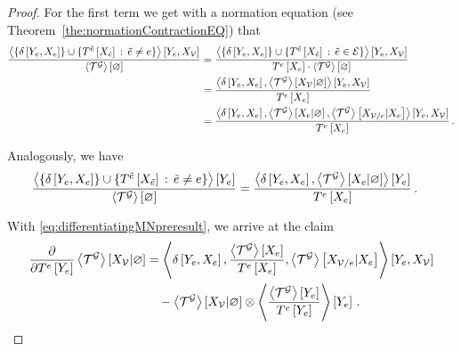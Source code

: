 \begin{proof}
    For the first term we get with a normation equation (see Theorem~\ref{the:normationContractionEQ}) that
    \begin{align*}
        \frac{ \left\langle \{\delta\left[Y_{e},X_{e}\right]\}\cup\{T^{\tilde{e}}\left[X_{\tilde{e}}\right] \, : \, \tilde{e}\neq e \}\right\rangle \left[ Y_{e},X_{\mathcal{V}} \right]}{\left\langle \mathcal{T}^{\mathcal{G}}\right\rangle \left[ \varnothing \right]}
        &= \frac{\left\langle \{\delta\left[Y_{e},X_{e}\right]\}\cup\{T^{\tilde{e}}\left[X_{\tilde{e}}\right] \, : \, \tilde{e}\in\mathcal{E} \}\right\rangle \left[ Y_{e},X_{\mathcal{V}} \right]}{T^{e}\left[X_{e}\right]  \cdot \left\langle \mathcal{T}^{\mathcal{G}}\right\rangle \left[ \varnothing \right]} \\
        &= \frac{
            \left\langle \delta\left[Y_{e},X_{e}\right],\left\langle \mathcal{T}^{\mathcal{G}}\right\rangle \left[ X_{\mathcal{V}} | \varnothing \right]\right\rangle \left[ Y_{e},X_{\mathcal{V}} \right]
        }{T^{e}\left[X_{e}\right]}  \\
        &= \frac{\left\langle \delta\left[Y_{e},X_{e}\right],
            \left\langle \mathcal{T}^{\mathcal{G}}\right\rangle \left[ X_{e} | \varnothing \right],
            \left\langle \mathcal{T}^{\mathcal{G}}\right\rangle \left[ X_{\mathcal{V}/e} | X_{e} \right]
        \right\rangle \left[ Y_{e},X_{\mathcal{V}} \right]
        }{T^{e}\left[X_{e}\right]}  \, .
    \end{align*}

    Analogously, we have
    \begin{align*}
        \frac{ \contractionof{\{\identityat{\seccatvariableof{\edge},\edgevariables}\}\cup\{\hypercoreofat{\secedge}{\catvariableof{\secedge}} \, : \, \secedge\neq\edge \}}{\seccatvariableof{\edge}}}{\contraction{\extnet}}
        &= \frac{\sbcontractionof{\identityat{\seccatvariableof{\edge},\edgevariables},
            \normationof{\extnet}{\edgevariables}%
        }{\seccatvariableof{\edge}}
        }{\hypercoreofat{\edge}{\edgevariables}}  \, .
    \end{align*}

    With \eqref{eq:differentiatingMNpreresult}, we arrive at the claim
    \begin{align*}
        \frac{\partial }{\partial T^{e}\left[Y_{e}\right]} \left\langle \mathcal{T}^{\mathcal{G}}\right\rangle \left[ X_{\mathcal{V}} | \varnothing \right]
        & = \left\langle 
            \delta\left[Y_{e},X_{e}\right],
            \frac{\left\langle \mathcal{T}^{\mathcal{G}}\right\rangle \left[ X_{e} \right]}{T^{e}\left[X_{e}\right]},
            \left\langle \mathcal{T}^{\mathcal{G}}\right\rangle \left[ X_{\mathcal{V}/e} | X_{e} \right] \right\rangle \left[ Y_{e},X_{\mathcal{V}} \right] \\
        & \quad -  \left\langle \mathcal{T}^{\mathcal{G}}\right\rangle \left[ X_{\mathcal{V}} | \varnothing \right] \otimes \left\langle \frac{\left\langle \mathcal{T}^{\mathcal{G}}\right\rangle \left[ Y_{e} \right]}{T^{e}\left[Y_{e}\right]}
        \right\rangle \left[ Y_{e} \right] \, .
    \end{align*}

\end{proof}


